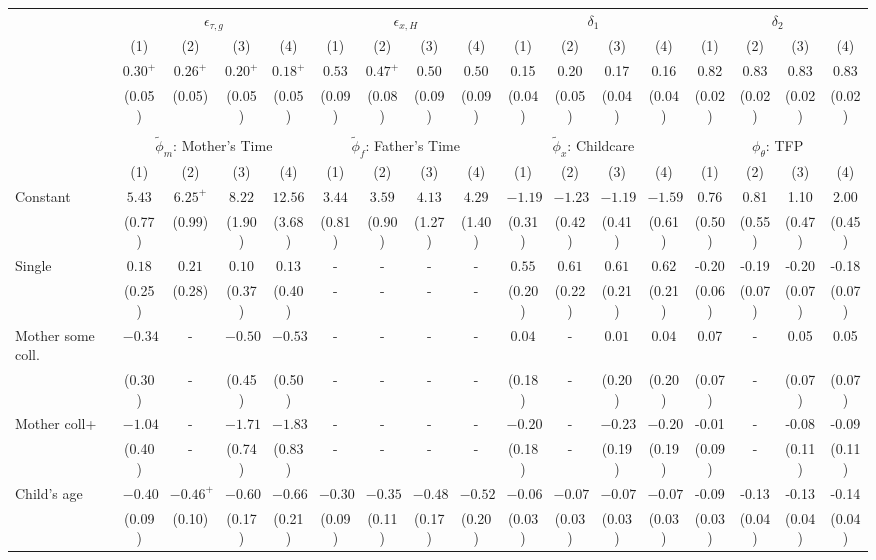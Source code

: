 \begin{tabular}{lcccccccccccccccc}\\\toprule
 & \multicolumn{4}{c}{$\epsilon_{\tau,g}$} & \multicolumn{4}{c}{$\epsilon_{x,H}$} & \multicolumn{4}{c}{$\delta_{1}$} & \multicolumn{4}{c}{$\delta_{2}$} \\
&(1)&(2)&(3)&(4)&(1)&(2)&(3)&(4)&(1)&(2)&(3)&(4)&(1)&(2)&(3)&(4)\\\cmidrule(r){2-5}\cmidrule(r){6-9}\cmidrule(r){10-13}\cmidrule(r){14-17}
&$0.30^{+}$&$0.26^{+}$&$0.20^{+}$&$0.18^{+}$&$0.53$&$0.47^{+}$&$0.50$&$0.50$&0.15&0.20&0.17&0.16&0.82&0.83&0.83&0.83\\
&(0.05)&(0.05)&(0.05)&(0.05)&(0.09)&(0.08)&(0.09)&(0.09)&(0.04)&(0.05)&(0.04)&(0.04)&(0.02)&(0.02)&(0.02)&(0.02)\\
&&&&&&&&&&&&&&&&\\
 & \multicolumn{4}{c}{$\tilde{\phi}_{m}$: Mother's Time} & \multicolumn{4}{c}{$\tilde{\phi}_{f}$: Father's Time} & \multicolumn{4}{c}{$\tilde{\phi}_{x}$: Childcare} & \multicolumn{4}{c}{$\phi_{\theta}$: TFP} \\
&(1)&(2)&(3)&(4)&(1)&(2)&(3)&(4)&(1)&(2)&(3)&(4)&(1)&(2)&(3)&(4)\\\cmidrule(r){2-5}\cmidrule(r){6-9}\cmidrule(r){10-13}\cmidrule(r){14-17}
Constant&$5.43$&$6.25^{+}$&$8.22$&$12.56$&$3.44$&$3.59$&$4.13$&$4.29$&$-1.19$&$-1.23$&$-1.19$&$-1.59$&0.76&0.81&1.10&2.00\\
&(0.77)&(0.99)&(1.90)&(3.68)&(0.81)&(0.90)&(1.27)&(1.40)&(0.31)&(0.42)&(0.41)&(0.61)&(0.50)&(0.55)&(0.47)&(0.45)\\
Single&$0.18$&$0.21$&$0.10$&$0.13$&-&-&-&-&$0.55$&$0.61$&$0.61$&$0.62$&-0.20&-0.19&-0.20&-0.18\\
&(0.25)&(0.28)&(0.37)&(0.40)&-&-&-&-&(0.20)&(0.22)&(0.21)&(0.21)&(0.06)&(0.07)&(0.07)&(0.07)\\
Mother some coll.&$-0.34$&-&$-0.50$&$-0.53$&-&-&-&-&$0.04$&-&$0.01$&$0.04$&0.07&-&0.05&0.05\\
&(0.30)&-&(0.45)&(0.50)&-&-&-&-&(0.18)&-&(0.20)&(0.20)&(0.07)&-&(0.07)&(0.07)\\
Mother coll+&$-1.04$&-&$-1.71$&$-1.83$&-&-&-&-&$-0.20$&-&$-0.23$&$-0.20$&-0.01&-&-0.08&-0.09\\
&(0.40)&-&(0.74)&(0.83)&-&-&-&-&(0.18)&-&(0.19)&(0.19)&(0.09)&-&(0.11)&(0.11)\\
Child's age&$-0.40$&$-0.46^{+}$&$-0.60$&$-0.66$&$-0.30$&$-0.35$&$-0.48$&$-0.52$&$-0.06$&$-0.07$&$-0.07$&$-0.07$&-0.09&-0.13&-0.13&-0.14\\
&(0.09)&(0.10)&(0.17)&(0.21)&(0.09)&(0.11)&(0.17)&(0.20)&(0.03)&(0.03)&(0.03)&(0.03)&(0.03)&(0.04)&(0.04)&(0.04)\\

\end{tabular}

